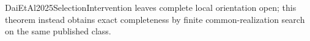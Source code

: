DaiEtAl2025SelectionIntervention leaves complete local orientation open; this theorem instead obtains exact completeness by finite common-realization search on the same published class.